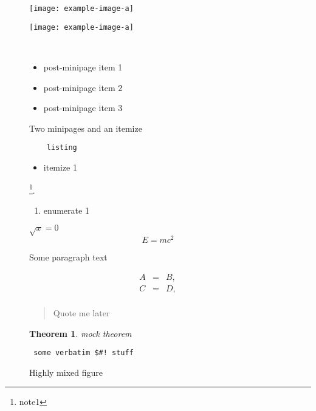 \documentclass{article}
\newtheorem{theorem}{Theorem}
\begin{document}
\begin{figure}
  \begin{minipage}[t]{0.4\textwidth}
    \texttt{[image: example-image-a]}
  \end{minipage}
  \begin{minipage}[t]{0.4\textwidth}
    \texttt{[image: example-image-a]}
  \end{minipage} \\
  \begin{center}\begin{itemize}
    \item post-minipage item 1
    \item post-minipage item 2
    \item post-minipage item 3
  \end{itemize}\end{center}
  \caption{Two minipages and an itemize}
\end{figure}
\clearpage

\begin{figure}
  \begin{lstlisting}
    listing
  \end{lstlisting}%
  \begin{itemize}\item itemize 1 \end{itemize}\footnote{note1}.%
  \begin{enumerate}\item enumerate 1 \end{enumerate}%
  $ \sqrt{x} = 0 $%
  \[ E = mc^2 \]%

  Some paragraph text

  \begin{eqnarray*}
    A&=&B,\\
    C&=&D,\\
  \end{eqnarray*}
  \begin{quote}Quote me later\end{quote}%
  \begin{theorem} mock theorem \end{theorem}%
  \begin{verbatim} some verbatim $#! stuff \end{verbatim}%
  \caption{Highly mixed figure}
\end{figure}
\clearpage
\end{document}
